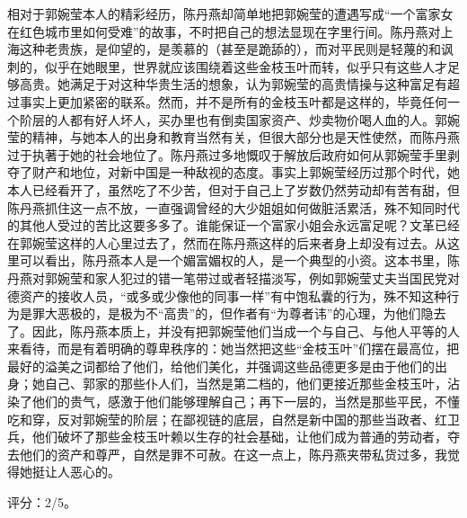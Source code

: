 相对于郭婉莹本人的精彩经历，陈丹燕却简单地把郭婉莹的遭遇写成“一个富家女在红色城市里如何受难”的故事，不时把自己的想法显现在字里行间。陈丹燕对上海这种老贵族，是仰望的，是羡慕的（甚至是跪舔的），而对平民则是轻蔑的和讽刺的，似乎在她眼里，世界就应该围绕着这些金枝玉叶而转，似乎只有这些人才足够高贵。她满足于对这种华贵生活的想象，认为郭婉莹的高贵情操与这种富足有超过事实上更加紧密的联系。然而，并不是所有的金枝玉叶都是这样的，毕竟任何一个阶层的人都有好人坏人，买办里也有倒卖国家资产、炒卖物价喝人血的人。郭婉莹的精神，与她本人的出身和教育当然有关，但很大部分也是天性使然，而陈丹燕过于执著于她的社会地位了。陈丹燕过多地慨叹于解放后政府如何从郭婉莹手里剥夺了财产和地位，对新中国是一种敌视的态度。事实上郭婉莹经历过那个时代，她本人已经看开了，虽然吃了不少苦，但对于自己上了岁数仍然劳动却有苦有甜，但陈丹燕抓住这一点不放，一直强调曾经的大少姐姐如何做脏活累活，殊不知同时代的其他人受过的苦比这要多多了。谁能保证一个富家小姐会永远富足呢？文革已经在郭婉莹这样的人心里过去了，然而在陈丹燕这样的后来者身上却没有过去。从这里可以看出，陈丹燕本人是一个媚富媚权的人，是一个典型的小资。这本书里，陈丹燕对郭婉莹和家人犯过的错一笔带过或者轻描淡写，例如郭婉莹丈夫当国民党对德资产的接收人员，“或多或少像他的同事一样”有中饱私囊的行为，殊不知这种行为是罪大恶极的，是极为不“高贵”的，但作者有“为尊者讳”的心理，为他们隐去了。因此，陈丹燕本质上，并没有把郭婉莹他们当成一个与自己、与他人平等的人来看待，而是有着明确的尊卑秩序的：她当然把这些“金枝玉叶”们摆在最高位，把最好的溢美之词都给了他们，给他们美化，并强调这些品德更多是由于他们的出身；她自己、郭家的那些仆人们，当然是第二档的，他们更接近那些金枝玉叶，沾染了他们的贵气，感激于他们能够理解自己；再下一层的，当然是那些平民，不懂吃和穿，反对郭婉莹的阶层；在鄙视链的底层，自然是新中国的那些当政者、红卫兵，他们破坏了那些金枝玉叶赖以生存的社会基础，让他们成为普通的劳动者，夺去他们的资产和尊严，自然是罪不可赦。在这一点上，陈丹燕夹带私货过多，我觉得她挺让人恶心的。

评分：2/5。